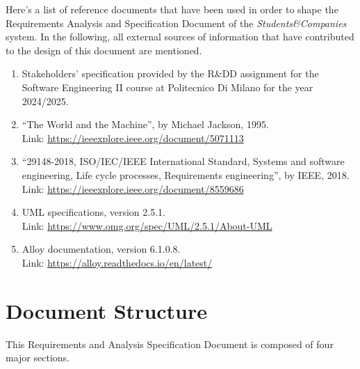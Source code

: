 Here’s a list of reference documents that have been used in order to shape the Requirements Analysis and Specification Document of the \textit{Students\&Companies} system. In the following, all external sources of information that have contributed to the design of this document are mentioned.

\begin{enumerate}
    \item Stakeholders’ specification provided by the R\&DD assignment for the Software Engineering II course at Politecnico Di Milano for the year 2024/2025.
    \item ``The World and the Machine'', by Michael Jackson, 1995. \\
    Link: \url{https://ieeexplore.ieee.org/document/5071113}
    \item ``29148-2018, ISO/IEC/IEEE International Standard, Systems and software engineering, Life cycle processes, Requirements engineering'', by IEEE, 2018. \\
    Link: \url{https://ieeexplore.ieee.org/document/8559686}
    \item UML specifications, version 2.5.1. \\
    Link: \url{https://www.omg.org/spec/UML/2.5.1/About-UML}
    \item Alloy documentation, version 6.1.0.8. \\
    Link: \url{https://alloy.readthedocs.io/en/latest/}
\end{enumerate}


\section{Document Structure}

This Requirements and Analysis Specification Document is composed of four major sections.

